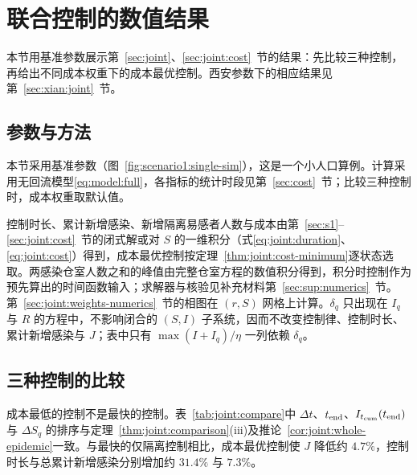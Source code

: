 \section{联合控制的数值结果}
\label{sec:num}
\label{sec:numerics}
本节用基准参数展示第~\ref{sec:joint}、\ref{sec:joint:cost}~节的结果：先比较三种控制，再给出不同成本权重下的成本最优控制。西安参数下的相应结果见第~\ref{sec:xian:joint}~节。
\subsection{参数与方法}
\label{sec:num:methods}
本节采用基准参数（图~\ref{fig:scenario1:single-sim}），这是一个小人口算例。计算采用无回流模型\eqref{eq:model:full}，各指标的统计时段见第~\ref{sec:cost}~节；比较三种控制时，成本权重取默认值。

控制时长、累计新增感染、新增隔离易感者人数与成本由第~\ref{sec:s1}--\ref{sec:joint:cost}~节的闭式解或对 $S$ 的一维积分（式\eqref{eq:joint:duration}、\eqref{eq:joint:cost}）得到，成本最优控制按定理~\ref{thm:joint:cost-minimum}逐状态选取。两感染仓室人数之和的峰值由完整仓室方程的数值积分得到，积分时控制作为预先算出的时间函数输入；求解器与核验见补充材料第~\ref{sec:sup:numerics}~节。第~\ref{sec:joint:weights-numerics}~节的相图在 $(r,S)$ 网格上计算。$\delta_q$ 只出现在 $I_q$ 与 $R$ 的方程中，不影响闭合的 $(S,I)$ 子系统，因而不改变控制律、控制时长、累计新增感染与 $J$；表中只有 $\max(I+I_q)/\eta$ 一列依赖 $\delta_q$。

\FloatBarrier
\subsection{三种控制的比较}
\label{sec:joint:compare-numerics}
成本最低的控制不是最快的控制。表~\ref{tab:joint:compare}中 $\Delta t$、$t_{\rm end}$、$I_{t_{\mathrm{cum}}}(t_{\rm end})$ 与 $\Delta S_q$ 的排序与定理~\ref{thm:joint:comparison}(iii)及推论~\ref{cor:joint:whole-epidemic}一致。与最快的仅隔离控制相比，成本最优控制使 $J$ 降低约 $4.7\%$，控制时长与总累计新增感染分别增加约 $31.4\%$ 与 $7.3\%$。


